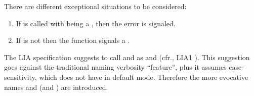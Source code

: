 \documentclass[../Comparisons-Predicates.tex]{subfiles}
\begin{document}
    \DExceptional{}

    There are different exceptional situations to be considered:
    \begin{enumerate}
        \item If  is called with
         being a , then the
         error is signaled.
        \item If  is not \CL{}
         then the function  signals a
        .
    \end{enumerate}


    \DNotes{}

    The LIA specification suggests to call  and 
    as  and  (cfr., LIA1
    \cite{2012:LIA1}). This suggestion goes against the traditional \CL{}
    naming verbosity ``feature'', plus it assumes case-sensitivity, which
    \CL{} does not have in default mode. Therefore the more evocative
    names  and  (and ) are
    introduced.
\end{document}
